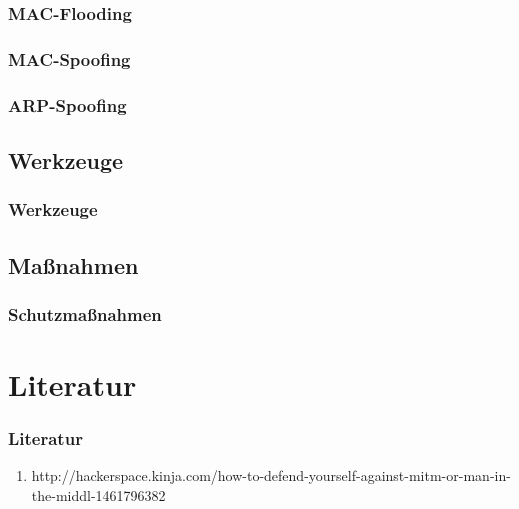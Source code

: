 \documentclass{beamer}
\begin{document}
        \begin{frame}
        	\frametitle{MAC-Flooding}
                       	
    	\end{frame}
		\begin{frame}
        	\frametitle{MAC-Spoofing}
                       	
    	\end{frame}
    	\begin{frame}
    		\frametitle{ARP-Spoofing}
    	                       	
    	\end{frame}
    	\subsection*{Werkzeuge}
		\begin{frame}
        	\frametitle{Werkzeuge}
                       	
    	\end{frame}
    	\subsection*{Maßnahmen}
		\begin{frame}
        	\frametitle{Schutzmaßnahmen}
                       	
    	\end{frame}  
    	
    \section{Literatur}
    	\begin{frame}
    		\frametitle{Literatur}
    		\begin{enumerate}
    			\item http://hackerspace.kinja.com/how-to-defend-yourself-against-mitm-or-man-in-the-middl-1461796382
    		\end{enumerate}
    	\end{frame}
\end{document}
